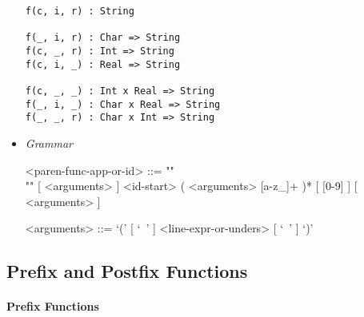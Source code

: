 \documentclass[diploma]{softlab-thesis}
\begin{document}
\begin{itemize}
\begin{verbatim}
f(c, i, r) : String

f(_, i, r) : Char => String
f(c, _, r) : Int => String
f(c, i, _) : Real => String

f(c, _, _) : Int x Real => String
f(_, i, _) : Char x Real => String
f(_, _, r) : Char x Int => String
\end{verbatim}

\item \textit{Grammar}
\begin{grammar}
<paren-func-app-or-id> ::= ""\\""
[ <arguments> ] <id-start> ( <arguments> [a-z_]+ )* [ [0-9] ]
[ <arguments> ]

<arguments> ::= `(' [ `\ ' ] <line-expr-or-unders> [ `\ ' ] `)'

\end{grammar}

\end{itemize}

\newpage

\subsection{Prefix and Postfix Functions}
\label{subsubsec:prefixpostfix}

\paragraph{Prefix Functions}
\end{document}
